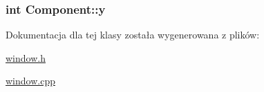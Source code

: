 \subsubsection[{\texorpdfstring{y}{y}}]{\setlength{\rightskip}{0pt plus 5cm}int Component\+::y\hspace{0.3cm}{\ttfamily [protected]}}\hypertarget{classComponent_a3cbb2a0f076a05810ad64ac22ea10402}{}\label{classComponent_a3cbb2a0f076a05810ad64ac22ea10402}


Dokumentacja dla tej klasy została wygenerowana z plików\+:\begin{DoxyCompactItemize}
\item 
\hyperlink{window_8h}{window.\+h}\item 
\hyperlink{window_8cpp}{window.\+cpp}\end{DoxyCompactItemize}

